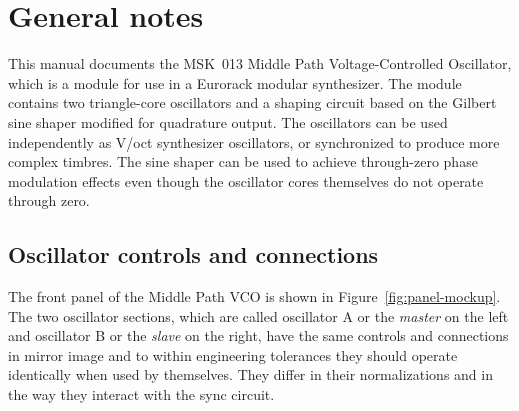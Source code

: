 
%
%
%
%
%
%

\chapter{General notes}

This manual documents the MSK~013 Middle Path Voltage-Controlled Oscillator,
which is a module for use in a Eurorack modular synthesizer.  The module
contains two triangle-core oscillators and a shaping circuit based on the
Gilbert sine shaper modified for quadrature output.  The oscillators can be
used independently as V/oct synthesizer oscillators, or synchronized to
produce more complex timbres.  The sine shaper can be used to achieve
through-zero phase modulation effects even though the oscillator cores
themselves do not operate through zero.

\section{Oscillator controls and connections}

The front panel of the Middle Path VCO is shown in
Figure~\ref{fig:panel-mockup}.  The two oscillator sections, which are
called oscillator A or the \emph{master} on the left and oscillator B or the
\emph{slave} on the right, have the same controls and connections in mirror
image and to within engineering tolerances they should operate identically
when used by themselves.  They differ in their normalizations and in the way
they interact with the sync circuit.

\begin{figure*}
{\centering\setlength{\fboxsep}{0pt}\setlength{\fboxrule}{0.6pt}%
\par}
\caption{Module front panel.}\label{fig:panel-mockup}
\end{figure*}

